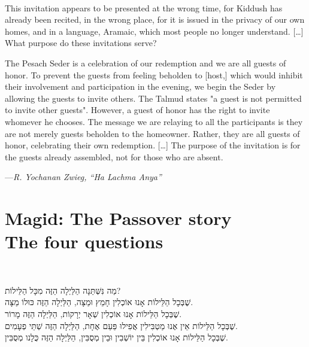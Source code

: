 \documentclass[a4paper,10pt,openany]{memoir}
\newcommand{\HgInst}[1]{{\noindent\sffamily{\bfseries{#1}}}}
\newcommand{\HgSource}[1]{\hfill{\small---\itshape{#1}}}
\newenvironment{HgEnglish}{\strut\\\noindent}{\vspace{1em}}
\newenvironment{HgHebrew}{\begin{otherlanguage}{hebrew}\strut\\\noindent\Large
}{\par\end{otherlanguage}\vspace{1em}}
\begin{document}
\begin{HgEnglish}
This invitation appears to be presented at the wrong time, for Kiddush has
already been recited, in the wrong place, for it is issued in the privacy of our
own homes, and in a language, Aramaic, which most people no longer understand.
[\ldots] What purpose do these invitations serve?

The Pesach Seder is a celebration of our redemption and we are all guests of
honor. To prevent the guests from feeling beholden to [host,] which would
inhibit their involvement and participation in the evening, we begin the Seder
by allowing the guests to invite others. The Talmud states "a guest is not
permitted to invite other guests". However, a guest of honor has the right to
invite whomever he chooses. The message we are relaying to all the participants
is they are not merely guests beholden to the homeowner. Rather, they are all
guests of honor, celebrating their own redemption. [\ldots] The purpose of the
invitation is for the guests already assembled, not for those who are absent.

\HgSource{R. Yochanan Zwieg, ``Ha Lachma Anya''}
\end{HgEnglish}

\chapter{Magid: The Passover story \\ {\LARGE The four questions}}

\vfill

\HgInst{The youngest person present recites:}

\begin{HgHebrew}
מַה נִּשְּׁתַּנָה הַלַּיְלָה הַזֶּה מִכָּל הַלֵּילוֹת? 
\\
שֶׁבְּכָל הַלֵּילוֹת אָנוּ אוֹכְלִין חָמֵץ וּמַצָּה,
הַלַּיְלָה הַזֶּה כּוּלוֹ מַצָּה. 
\\
שֶׁבְּכָל הַלֵּילוֹת אָנוּ אוֹכְלִין שְׁאָר יְרָקוֹת,
הַלַּיְלָה הַזֶּה מָרוֹר. 
\\
שֶׁבְּכָל הַלֵּילוֹת אֵין אֶנוּ מַטְבִּילִין אֲפִילוּ פַּעַם אֶחָת, 
הַלַּיְלָה הַזֶּה שְׁתֵּי פְעָמִים. 
\\
שֶׁבְּכָל הַלֵּילוֹת אָנוּ אוֹכְלִין בֵּין יוֹשְׁבִין וּבֵין מְסֻבִּין, 
הַלַּיְלָה הַזֶּה כֻּלָנו מְסֻבִּין. 
\end{HgHebrew}
\end{document}
